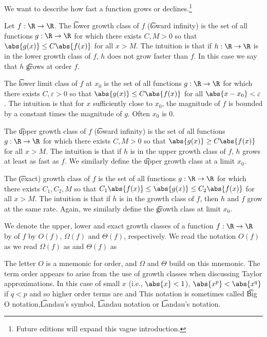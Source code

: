 

We want to describe how fast a function grows or declines.\footnote{Future editions will expand this vague introduction.}


Let $f: \R \to \R$.
The \t{lower growth class} of $f$ (\t{toward infinity}) is the set of all functions $g: \R \to \R$ for which there exists $C, M > 0$ so that $\abs{g(x)} \leq C\abs{f(x)}$ for all $x > M$.
The intuition is that if $h: \R \to \R$ is in the lower growth class of $f$, $h$ does not grow faster than $f$.
In this case we say that $h$ \t{grows at order} $f$.

The \t{lower limit class of $f$ at $x_0$} is the set of all functions $g: \R \to \R$ for which there exists $C, \varepsilon > 0$ so that $\abs{g(x)} \leq C \abs{f(x)}$ for all $\abs{x - x_0} < \varepsilon$.
The intuition is that for $x$ sufficiently close to $x_0$, the magnitude of $f$ is bounded by a constant times the magnitude of $g$.
Often $x_0$ is $0$.

The \t{upper growth class} of $f$ (\t{toward infinity}) is the set of all functions $g: \R \to \R$ for which there exists $C, M > 0$ so that $\abs{g(x)} \geq C\abs{f(x)}$ for all $x > M$.
The intuition is that if $h$ is in the upper growth class of $f$, $h$ grows at least as fast as $f$.
We similarly define the \t{upper growth class at a limit $x_0$}.


The \t{(exact) growth class} of $f$ is the set of all functions $g: \R \to \R$ for which there exists $C_1, C_2, M$ so that $C_1\abs{f(x)} \leq \abs{g(x)} \leq C_2 \abs{f(x)}$ for all $x > M$.
The intuition is that if $h$ is in the growth class of $f$, then $h$ and $f$ grow at the same rate.
Again, we similarly define the \t{growth class at limit $x_0$}.


We denote the upper, lower and exact growth classes of a function $f: \R \to \R$ by  of $f$ by $O(f)$, $\Omega(f)$ and $\Theta(f)$, respectively.
We read the notation $O(f)$ as  we read $\Omega(f)$ as  and $\Theta(f)$ as 

The letter $O$ is a mnemonic for order, and $\Omega$ and $\Theta$ build on this mnemonic.
The term order appears to arise from the use of growth classes when discussing Taylor approximations.
In this case of small $x$ (i.e.,  $\abs{x} < 1$), $\abs{x^p} < \abs{x^q}$ if $q < p$ and so higher order terms are  and 
This notation is sometimes called \t{Big O notation},\t{Landau's symbol}, \t{Landau notation} or \t{Landau's notation}.

